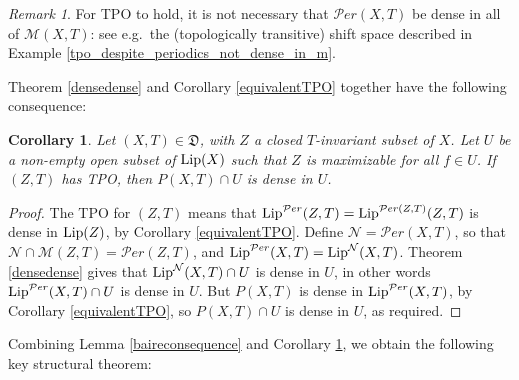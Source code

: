 \documentclass[reqno,11pt]{amsart}
\newtheorem{cor}[thm]{Corollary}
\theoremstyle{definition}
\theoremstyle{remark}
\theoremstyle{remark}
\newtheorem{rem}[thm]{Remark}
\def\m{\mathcal M}
\def\n{\mathcal N}
\def\per{{\mathcal{P}er}}
\def\lip{{\rm Lip}}
\def\D{\mathfrak{D}}
\numberwithin{equation}{section}
\begin{document}
\begin{rem}\label{not_follow_dense_m}
For TPO to hold, it is not necessary that $\per(X,T)$ be dense in all of $\m(X,T)$:
see e.g.~the (topologically transitive) shift space described in
Example \ref{tpo_despite_periodics_not_dense_in_m}.
\end{rem}



Theorem \ref{densedense} and Corollary \ref{equivalentTPO} together have the following consequence:


\begin{cor}\label{nequalsper}
Let $(X,T)\in\D$,
with $Z$ a closed $T$-invariant subset of $X$.
Let $U$ be a non-empty open subset of $\lip(X)$ such that $Z$ is maximizable for all $f\in U$.
If $(Z,T)$ has TPO, then 
 $P(X,T) \cap U$ is dense in $U$.
\end{cor}
\begin{proof}
The TPO for $(Z,T)$ means that
$\lip^\per(Z,T)=\lip^{\per(Z,T)}(Z,T)$ is dense in $\lip(Z)$, by Corollary \ref{equivalentTPO}.
Define  $\n=\per(X,T)$, so that $\n\cap\m(Z,T)=\per(Z,T)$,
and $\lip^{\per}(X,T)=\lip^\n(X,T)$.
Theorem \ref{densedense}
gives that
 $\lip^\n(X,T) \cap U$ is dense in $U$,
in other words $\lip^\per(X,T) \cap U$ is dense in $U$.
But $P(X,T)$ is dense in $\lip^\per(X,T)$, by Corollary  \ref{equivalentTPO},
so $P(X,T) \cap U$ is dense in $U$, as required.
\end{proof}

Combining  Lemma \ref{baireconsequence} and Corollary \ref{nequalsper},
we obtain the following key structural theorem:
\end{document}
